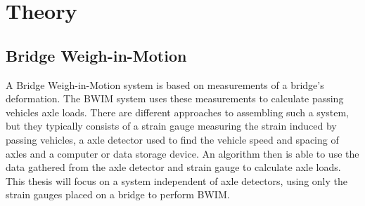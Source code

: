 \chapter{Theory}

\section{Bridge Weigh-in-Motion}
A Bridge Weigh-in-Motion system is based on measurements of a bridge's deformation. The BWIM system uses these measurements to calculate passing vehicles axle loads.
There are different approaches to assembling such a system, but they typically consists of a strain gauge measuring the strain induced by passing vehicles, a axle detector used to find the vehicle speed and spacing of axles and a computer or data storage device. An algorithm then is able to use the data gathered from the axle detector and strain gauge to calculate axle loads. This thesis will focus on a system independent of axle detectors, using only the strain gauges placed on a bridge to perform BWIM.
